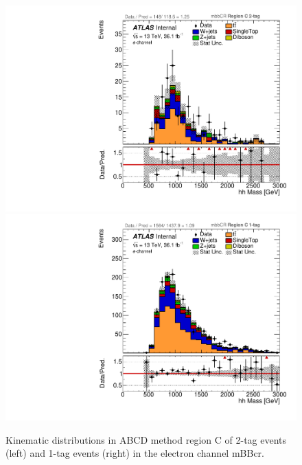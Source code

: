 \begin{figure}[!htbp]
\begin{center}
\includegraphics[scale=0.33]{./figures/boosted/ABCD_ScaledPrompt/elec_mbbcr_RegionC_hhMass}
\includegraphics[scale=0.33]{./figures/boosted/ABCD_ScaledPrompt/elec_mbbcr_RegionC_1tag_hhMass}
\caption{Kinematic distributions in ABCD method region C of 2-tag events (left) and 1-tag events (right) in the electron channel mBBcr.}
\label{fig:boosted_abcd_scaledprompt_region_c_mbbcr_elec}
\end{center}
\end{figure}


